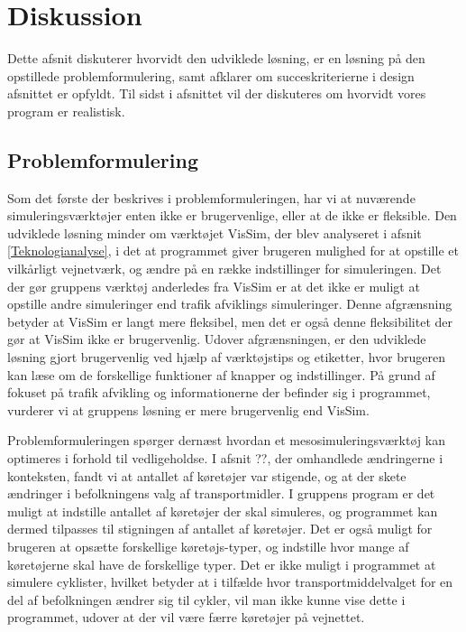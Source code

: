 \section{Diskussion}


Dette afsnit diskuterer hvorvidt den udviklede løsning, er en løsning på den opstillede problemformulering, samt afklarer om succeskriterierne i design afsnittet er opfyldt. Til sidst i afsnittet vil der diskuteres om hvorvidt vores program er realistisk.

\subsection{Problemformulering}
Som det første der beskrives i problemformuleringen, har vi at nuværende simuleringsværktøjer enten ikke er brugervenlige, eller at de ikke er fleksible. Den udviklede løsning minder om værktøjet VisSim, der blev analyseret i afsnit \ref{Teknologianalyse}, i det at programmet giver brugeren mulighed for at opstille et vilkårligt vejnetværk, og ændre på en række indstillinger for simuleringen. Det der gør gruppens værktøj anderledes fra VisSim er at det ikke er muligt at opstille andre simuleringer end trafik afviklings simuleringer. Denne afgrænsning betyder at VisSim er langt mere fleksibel, men det er også denne fleksibilitet der gør at VisSim ikke er brugervenlig. Udover afgrænsningen, er den udviklede løsning gjort brugervenlig ved hjælp af værktøjstips og etiketter, hvor brugeren kan læse om de forskellige funktioner af knapper og indstillinger. På grund af fokuset på trafik afvikling og informationerne der befinder sig i programmet, vurderer vi at gruppens løsning er mere brugervenlig end VisSim.

\vspace{5mm}
Problemformuleringen spørger dernæst hvordan et mesosimuleringsværktøj kan optimeres i forhold til vedligeholdse. I afsnit ??, der omhandlede ændringerne i konteksten, fandt vi at antallet af køretøjer var stigende, og at der skete ændringer i befolkningens valg af transportmidler. I gruppens program er det muligt at indstille antallet af køretøjer der skal simuleres, og programmet kan dermed tilpasses til stigningen af antallet af køretøjer. Det er også muligt for brugeren at opsætte forskellige køretøjs-typer, og indstille hvor mange af køretøjerne skal have de forskellige typer. Det er ikke muligt i programmet at simulere cyklister, hvilket betyder at i tilfælde hvor transportmiddelvalget for en del af befolkningen ændrer sig til cykler, vil man ikke kunne vise dette i programmet, udover at der vil være færre køretøjer på vejnettet. 

